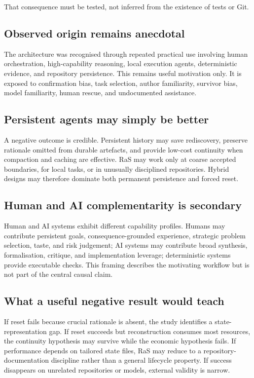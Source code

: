 That consequence must be tested, not inferred from the existence of tests or Git.

\subsection{Observed origin remains anecdotal}

The architecture was recognised through repeated practical use involving human orchestration, high-capability reasoning, local execution agents, deterministic evidence, and repository persistence. This remains useful motivation only. It is exposed to confirmation bias, task selection, author familiarity, survivor bias, model familiarity, human rescue, and undocumented assistance.

\subsection{Persistent agents may simply be better}

A negative outcome is credible. Persistent history may save rediscovery, preserve rationale omitted from durable artefacts, and provide low-cost continuity when compaction and caching are effective. RaS may work only at coarse accepted boundaries, for local tasks, or in unusually disciplined repositories. Hybrid designs may therefore dominate both permanent persistence and forced reset.

\subsection{Human and AI complementarity is secondary}

Human and AI systems exhibit different capability profiles. Humans may contribute persistent goals, consequence-grounded experience, strategic problem selection, taste, and risk judgement; AI systems may contribute broad synthesis, formalisation, critique, and implementation leverage; deterministic systems provide executable checks. This framing describes the motivating workflow but is not part of the central causal claim.

\subsection{What a useful negative result would teach}

If reset fails because crucial rationale is absent, the study identifies a state-representation gap. If reset succeeds but reconstruction consumes most resources, the continuity hypothesis may survive while the economic hypothesis fails. If performance depends on tailored state files, RaS may reduce to a repository-documentation discipline rather than a general lifecycle property. If success disappears on unrelated repositories or models, external validity is narrow.

